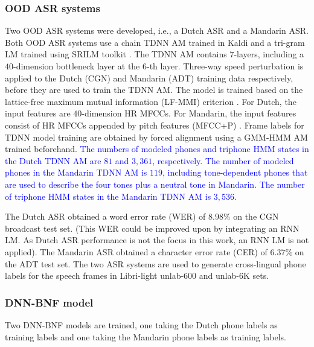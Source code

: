 \documentclass[transmag]{IEEEtran}
\begin{document}
\subsubsection{OOD ASR systems}
\label{subsubsec:expsetup_backend_ood}
Two OOD ASR systems were developed, i.e., a Dutch ASR and a Mandarin ASR. Both OOD ASR systems use a chain TDNN AM trained in Kaldi \cite{povey2011kaldi}  and a tri-gram LM trained using SRILM toolkit \cite{Stolcke02srilm--}. The TDNN AM contains $7$-layers, including a $40$-dimension bottleneck layer at the $6$-th layer. Three-way speed perturbation \cite{ko2015audio} is applied to the Dutch (CGN) and Mandarin (ADT) training data respectively, before they are used to train the TDNN AM.
The model is trained based on the lattice-free maximum mutual information (LF-MMI) criterion \cite{povey2016purely}. For Dutch, the input features are $40$-dimension HR MFCCs. For Mandarin, the input features consist of HR MFCCs appended by pitch features (MFCC+P) \cite{ghahremani2014pitch}. Frame labels for TDNN model training are obtained by forced alignment using a GMM-HMM AM trained beforehand. 
\textcolor{blue}{The numbers of modeled 
phones and triphone HMM states in the Dutch TDNN AM are $81$ and $3,361$, respectively. The number of modeled phones in the Mandarin TDNN AM is $119$,  including tone-dependent phones that are used to describe the four tones plus a neutral tone in Mandarin. The number of   triphone HMM states in the Mandarin TDNN AM is $3,536$.}

The Dutch ASR obtained a word error rate (WER) of $8.98\%$ on the CGN broadcast test set. (This WER could be improved upon by integrating an RNN LM. As Dutch ASR performance is not the focus in this work, an RNN LM is not applied). The Mandarin ASR obtained a character error rate (CER) of $6.37\%$ on the ADT test set. The two ASR systems are used to generate cross-lingual phone labels for the speech frames in Libri-light unlab-600 and unlab-6K sets.
\subsubsection{DNN-BNF model}
\label{subsubsec:expsetup_backend_dnn_bnf}
Two DNN-BNF models are trained, one taking the Dutch phone labels as training labels and one taking the Mandarin phone labels as training labels.
\end{document}
